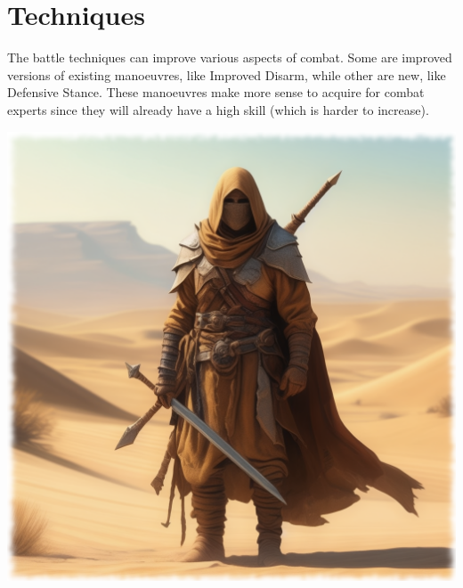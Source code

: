 \section{Techniques}
The battle techniques can improve various aspects of combat. Some are improved versions of existing manoeuvres, like Improved Disarm, while other are new, like Defensive Stance. These manoeuvres make more sense to acquire for combat experts since they will already have a high skill (which is harder to increase).

\begin{center}
\includegraphics[scale=0.24]{img/ai-images/legendary-warrior.png}
\end{center}


